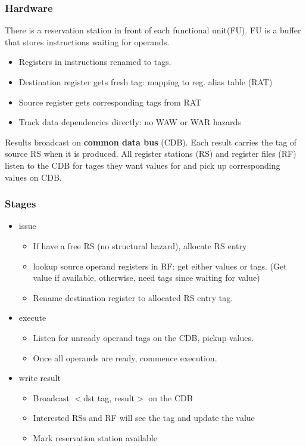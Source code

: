 \documentclass[letterpaper,12pt]{article}
\begin{document}
\subsubsection{Hardware}

There is a reservation station in front of each functional unit(FU). FU is a buffer that stores instructions waiting for operands.

\begin{itemize}
    \item Registers in instructions renamed to tags.
    \item Destination register gets fresh tag: mapping to reg. alias table (RAT)
    \item Source register gets corresponding tags from RAT
    \item Track data dependencies directly: no WAW or WAR hazards
\end{itemize}

Results broadcast on \textbf{common data bus} (CDB). Each result carries the tag of source RS when it is produced. All register stations (RS) and register files (RF) listen to the CDB for tages they want values for and pick up corresponding values on CDB.

\subsubsection{Stages}

\begin{itemize}
    \item issue
          \begin{itemize}
              \item If have a free RS (no structural hazard), allocate RS entry
              \item lookup source operand registers in RF: get either values or tags. (Get value if available, otherwise, need tags since waiting for value)
              \item Rename destination register to allocated RS entry tag.
          \end{itemize}
    \item execute
          \begin{itemize}
              \item Listen for unready operand tags on the CDB, pickup values.
              \item Once all operands are ready, commence execution.
          \end{itemize}
    \item write result
          \begin{itemize}
              \item Broadcast $<$dst tag, result$>$ on the CDB
              \item Interested RSs and RF will see the tag and update the value
              \item Mark reservation station available
          \end{itemize}
\end{itemize}
\end{document}
